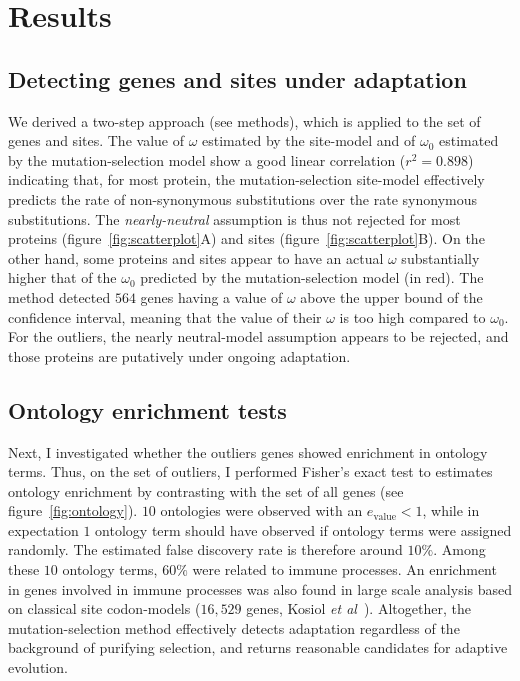 \documentclass{article}
\begin{document}
\section*{Results}

\subsection*{Detecting genes and sites under adaptation}

We derived a two-step approach (see methods), which is applied to the set of genes and sites.
The value of $\omega$ estimated by the site-model and of $\omega_{0}$ estimated by the mutation-selection model show a good linear correlation ($r^2=0.898$) indicating that, for most protein, the mutation-selection site-model effectively predicts the rate of non-synonymous substitutions over the rate synonymous substitutions.
The \textit{nearly-neutral} assumption is thus not rejected for most proteins (figure~\ref{fig:scatterplot}A) and sites (figure~\ref{fig:scatterplot}B).
On the other hand, some proteins and sites appear to have an actual $\omega$ substantially higher that of the $\omega_0$ predicted by the mutation-selection model (in red).
The method detected $564$ genes having a value of $\omega$ above the upper bound of the confidence interval, meaning that the value of their $\omega$ is too high compared to $\omega_{0}$.
For the outliers, the nearly neutral-model assumption appears to be rejected, and those proteins are putatively under ongoing adaptation.

\subsection*{Ontology enrichment tests}
Next, I investigated whether the outliers genes showed enrichment in ontology terms.
Thus, on the set of outliers, I performed Fisher's exact test to estimates ontology enrichment by contrasting with the set of all genes (see figure~\ref{fig:ontology}).
$10$ ontologies were observed with an $e_{\mathrm{value}} <1$, while in expectation $1$ ontology term should have observed if ontology terms were assigned randomly.
The estimated false discovery rate is therefore around $10 \%$.
Among these $10$ ontology terms, $60 \%$ were related to immune processes.
An enrichment in genes involved in immune processes was also found in large scale analysis based on classical site codon-models ($16,529$ genes, Kosiol \textit{et al}~\citep{kosiol_patterns_2008}).
Altogether, the mutation-selection method effectively detects adaptation regardless of the background of purifying selection, and returns reasonable candidates for adaptive evolution.
\end{document}
